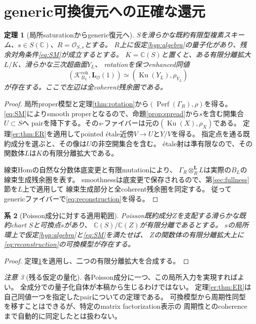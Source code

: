 \documentclass[a4paper,10pt]{ltjsarticle}
\newtheorem{theorem}{定理}[section]
\newtheorem{corollary}[theorem]{系}
\theoremstyle{definition}
\theoremstyle{remark}
\newtheorem{remark}[theorem]{注意}
\newcommand{\Perf}{\operatorname{Perf}}
\newcommand{\Ku}{\operatorname{Ku}}
\newcommand{\CC}{\mathbb C}
\newcommand{\OO}{\mathcal O}
\newcommand{\cK}{\mathcal K}
\newcommand{\otL}{\otimes^{\mathbf L}}
\newcommand{\LL}{\mathbf L}
\begin{document}



\section{generic可換復元への正確な還元}\label{sec:reconstruction}
\begin{theorem}[局所saturationからgeneric復元へ]\label{thm:generic}
$S$を滑らかな既約有限型複素スキーム、$s\in S(\CC)$、$R=\OO_{S,s}$とする。
$R$上に仮定\ref{hyp:algebra}の量子化があり、残余対角条件\eqref{eq:SM}が成立するとする。
$K=\CC(S)$と置くと、ある有限分離拡大$L/K$、滑らかな三次超曲面$Y_L$、
rotationを保つenhanced同値
\[
 (\cK_{B_L}^{\mathrm{coh}},\LL_{\OO}(1))
       \simeq (\Ku(Y_L),\rho_{Y_L})
 \tag{CR}\label{eq:reconstruction}
\]
が存在する。ここで左辺は全coherent残余圏である。
\end{theorem}
\begin{proof}
局所proper模型と定理\ref{thm:rotation}から$(\Perf(\Gamma_R),\rho)$を得る。
\eqref{eq:SM}によりsmooth properとなるので、命題\ref{prop:spread}から$s$を含む開集合$U\subset S$へ
pairを降下する。その$s$-ファイバーは元の$(\Ku(X),\rho_X)$である。
定理\ref{er:thm:ER}を適用してpointed étale近傍$V\to U$と$Y/V$を得る。
指定点を通る既約成分を選ぶと、その像は$U$の非空開集合を含む。
étale射は準有限なので、その関数体$L$は$K$の有限分離拡大である。

線束Homの自然な分数体底変更と有限mutationにより、
$\Gamma_R\otL_RL$は実際の$B_L$の線束生成残余圏を表す。
smoothnessは底変更で保存されるので、第\ref{sec:fullness}節を$L$上で適用して
線束生成部分と全coherent残余圏を同定する。
従ってgenericファイバーで\eqref{eq:reconstruction}を得る。
\end{proof}

\begin{corollary}[Poisson成分に対する適用範囲]\label{cor:component}
Poisson既約成分$Z$を支配する滑らかな既約chart $S$と可換点$s$があり、
$\CC(S)/\CC(Z)$が有限分離であるとする。
$s$の局所環上で仮定\ref{hyp:algebra}と\eqref{eq:SM}を満たせば、
$Z$の関数体の有限分離拡大上に\eqref{eq:reconstruction}の可換模型が存在する。
\end{corollary}
\begin{proof}
定理\ref{thm:generic}を適用し、二つの有限分離拡大を合成する。
\end{proof}

\begin{remark}[残る仮定の量化]
各Poisson成分に一つ、この局所入力を実現すればよい。
全成分での量子化自体が本稿から生じるわけではない。
定理\ref{er:thm:ER}は自己同値一つを指定したpairについての定理である。
可換模型から周期性同型を移すことはできるが、特定のmatrix factorization表示の
周期性とのcoherenceまで自動的に同定したとは扱わない。
\end{remark}
\end{document}
